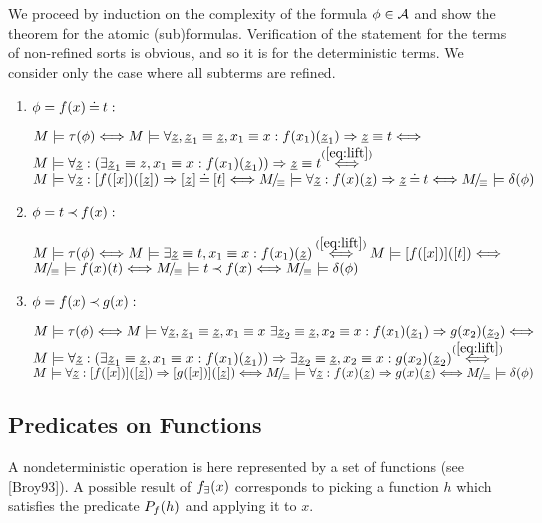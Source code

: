 \begin{PROOF}
We proceed by induction on the complexity of the formula $\phi\in\cal A$ and show the theorem for the atomic (sub)formulas. Verification of the statement for the terms of non-refined sorts is obvious, and so it is for the deterministic terms. We consider only the case where all subterms are refined. \begin{enumerate}
\item $\phi = f(x)\mathbin{\doteq} t:$

$M\models\tau(\phi) \mathrel{\Longleftrightarrow}
M\models \forall \underline{z}, \underline{z}_1\equiv \underline{z},x_1\equiv x: f(x_1)(\underline{z}_1) \mathrel\Rightarrow \underline{z}\equiv t \mathrel{\Longleftrightarrow} $\\
$M\models \forall \Ul z:(\exists \Ul z_1\equiv z,x_1\equiv x: f(x_1)(\Ul z_1))
\impl \Ul z\equiv t
\ToT{\re{eq:lift}} $\\
$M\models \forall \underline{z}: [f([x])([\underline{z}]) \mathrel\Rightarrow [\underline{z}]\mathbin{\doteq} [t] \mathrel{\Longleftrightarrow} M\!{\textstyle /}\!_\equiv\models \forall \underline{z}: f(x)(\underline{z}) \mathrel\Rightarrow \underline{z}\mathbin{\doteq} t \mathrel{\Longleftrightarrow} 
M\!{\textstyle /}\!_\equiv\models \delta(\phi)$
\item $\phi = t\mathbin{\prec} f(x):$

$M\models \tau(\phi)\ifff
M\models \exists \Ul z\equiv t, x_1\equiv x: f(x_1)(\Ul z) \ToT{\re{eq:lift}} M\models [f([x])]([t]) \ifff $\\
$M\!{\textstyle /}\!_\equiv\models f(x)(t) \mathrel{\Longleftrightarrow}
M\!{\textstyle /}\!_\equiv\models t\mathbin{\prec} f(x) \mathrel{\Longleftrightarrow} M\!{\textstyle /}\!_\equiv\models \delta(\phi)$ \item $\phi = f(x)\mathbin{\prec} g(x):$

$M\models \tau(\phi)\mathrel{\Longleftrightarrow} M\models
\forall \underline{z}, \underline{z}_1\equiv \underline{z}, x_1\equiv x\ \exists \underline{z}_2\equiv \underline{z}, x_2\equiv x: f(x_1)(\underline{z}_1)\mathrel\Rightarrow g(x_2)(\underline{z}_2)
\mathrel{\Longleftrightarrow} $\\
$M\models
\forall \Ul z : (\exists \Ul z_1\equiv \Ul z, x_1\equiv x : f(x_1)(\Ul z_1)) \impl \exists \Ul z_2\equiv \Ul z, x_2\equiv x: g(x_2)(\Ul z_2) \ToT{\re{eq:lift}} $\\
$M\models \forall\underline{z}:[f([x])]([\underline{z}])\mathrel\Rightarrow [g([x])]([\underline{z}]) \mathrel{\Longleftrightarrow}
M\!{\textstyle /}\!_\equiv\models \forall \underline{z}: f(x)(\underline{z})\mathrel\Rightarrow g(x)(\underline{z}) \mathrel{\Longleftrightarrow} M\!{\textstyle /}\!_\equiv\models \delta(\phi)$
\end{enumerate}
\end{PROOF}
%
\subsection{Predicates on Functions}
A nondeterministic operation is here represented by a set of functions (see [Broy93]). A
possible result of $f_\exists(x)$ corresponds to picking a function $h$ which satisfies the predicate $P_{f}(h)$ and applying it to $x$. 

